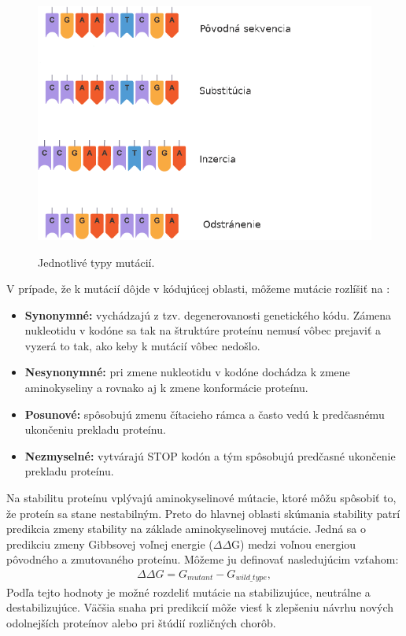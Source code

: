 \begin{figure}[H]
	\centering
	\begin{center}
		\scalebox{0.6}
		{   
			\includegraphics{mutation_types.png}
		}
		\caption[mutacie]{Jednotlivé typy mutácií\footnotemark.}
	\end{center}
\end{figure}

V prípade, že k mutácií dôjde v kódujúcej oblasti, môžeme mutácie rozlíšiť na \cite{flegr}:
\begin{itemize}
	\item \textbf{Synonymné:} vychádzajú z tzv. degenerovanosti genetického kódu. Zámena nukleotidu v kodóne sa tak na štruktúre proteínu nemusí vôbec prejaviť a vyzerá to tak, ako keby k mutácií vôbec nedošlo. 
	\item \textbf{Nesynonymné:} pri zmene nukleotidu v kodóne dochádza k zmene aminokyseliny a rovnako aj k zmene konformácie proteínu.
	\item \textbf{Posunové:} spôsobujú zmenu čítacieho rámca a často vedú k predčasnému ukončeniu prekladu proteínu.
	\item \textbf{Nezmyselné:} vytvárajú STOP kodón a tým spôsobujú predčasné ukončenie prekladu proteínu.
\end{itemize}
\newpage
Na stabilitu proteínu vplývajú aminokyselinové mútacie, ktoré môžu spôsobiť to, že proteín sa stane nestabilným. Preto do hlavnej oblasti skúmania stability patrí predikcia zmeny stability na základe aminokyselinovej mutácie. Jedná sa o predikciu zmeny Gibbsovej voľnej energie ($\Delta\Delta$G) medzi voľnou energiou pôvodného a zmutovaného proteínu. Môžeme ju definovať nasledujúcim vzťahom:
\begin{align}
	\Delta\Delta G = G_{mutant} - G_{wild\_type},
\end{align}
Podľa tejto hodnoty je možné rozdeliť mutácie na stabilizujúce, neutrálne a destabilizujúce. Väčšia snaha pri predikcií môže viesť k zlepšeniu návrhu nových odolnejších proteínov alebo pri štúdií rozličných chorôb.



